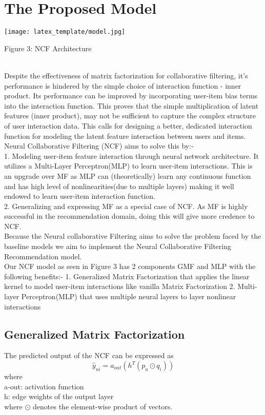 \documentclass[sigconf]{acmart}
\begin{document}
\section{The Proposed Model}\label{sec:framework}
\texttt{[image: latex\_template/model.jpg]}
\begin{center}
    Figure 3: NCF Architecture
\end{center}\\
Despite the effectiveness of matrix factorization for collaborative filtering, it’s performance is hindered by the simple choice of interaction function - inner product. Its performance can be improved by incorporating user-item bias terms into the interaction function. This proves that the simple multiplication of latent features (inner product), may not be sufficient to capture the complex structure of user interaction data.
This calls for designing a better, dedicated interaction function for modeling the latent feature interaction between users and items. Neural Collaborative Filtering (NCF) aims to solve this by:-\\
1. Modeling user-item feature interaction through neural network architecture. It utilizes a Multi-Layer Perceptron(MLP) to learn user-item interactions. This is an upgrade over MF as MLP can (theoretically) learn any continuous function and has high level of nonlinearities(due to multiple layers) making it well endowed to learn user-item interaction function.\\
2. Generalizing and expressing MF as a special case of NCF. As MF is highly successful in the recommendation domain, doing this will give more credence to NCF.\\
Because the Neural collaborative Filtering aims to solve the problem faced by the baseline models we aim to implement the Neural Collaborative Filtering Recommendation model.\\
Our NCF model as seen in Figure 3 has 2 components GMF and MLP with the following benefits:-
1. Generalized Matrix Factorization that applies the linear kernel to model user-item interactions like vanilla Matrix Factorization
2. Multi-layer Perceptron(MLP) that uses multiple neural layers to layer nonlinear interactions
\subsection{Generalized Matrix Factorization}
The predicted output of the NCF can be expressed as
$$ 
\hat{y}_{ui} = a_{out} (h^T(p_{u} \odot q_i))
$$
where\\
a-out: activation function\\
h: edge weights of the output layer\\
where $\odot$ denotes the element-wise product of vectors.\\
\end{document}
